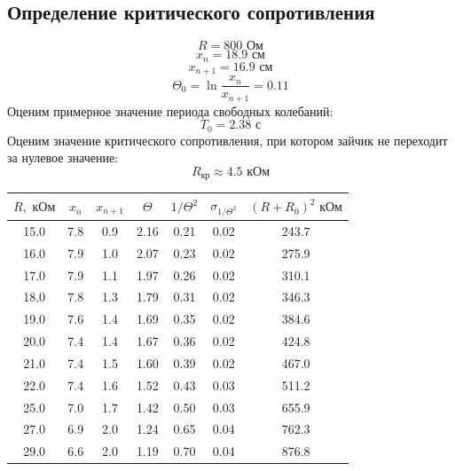 \documentclass[a4paper, 12pt]{article}
\begin{document}
\subsection*{Определение критического сопротивления}
$$R = 800 \text{ Ом}$$
$$x_n = 18.9 \text{ см}$$
$$x_{n+1} = 16.9 \text{ см}$$
$$\Theta_0 = \ln \dfrac{x_n}{x_{n+1}} = 0.11$$	
Оценим примерное значение периода свободных колебаний:
$$T_0 = 2.38 \text{ с}$$
Оценим значение критического сопротивления, при котором зайчик не переходит за нулевое значение:
$$R_{\text{кр}} \approx 4.5 \text{ кОм}$$

\begin{table}[H]
\centering
\begin{tabular}{|c|c|c|c|c|c|c|}
\hline
$R, \text{ кОм}$ & $x_n$ & $x_{n+1}$ & $\Theta$ & $1/\Theta^2$ & $\sigma_{1/\Theta^2}$ & $(R+R_0)^2 \text{ кОм}$ \\ \hline
15.0             & 7.8   & 0.9       & 2.16     & 0.21         & 0.02                  & 243.7                   \\ \hline
16.0             & 7.9   & 1.0       & 2.07     & 0.23         & 0.02                  & 275.9                   \\ \hline
17.0             & 7.9   & 1.1       & 1.97     & 0.26         & 0.02                  & 310.1                   \\ \hline
18.0             & 7.8   & 1.3       & 1.79     & 0.31         & 0.02                  & 346.3                   \\ \hline
19.0             & 7.6   & 1.4       & 1.69     & 0.35         & 0.02                  & 384.6                   \\ \hline
20.0             & 7.4   & 1.4       & 1.67     & 0.36         & 0.02                  & 424.8                   \\ \hline
21.0             & 7.4   & 1.5       & 1.60     & 0.39         & 0.02                  & 467.0                   \\ \hline
22.0             & 7.4   & 1.6       & 1.52     & 0.43         & 0.03                  & 511.2                   \\ \hline
25.0             & 7.0   & 1.7       & 1.42     & 0.50         & 0.03                  & 655.9                   \\ \hline
27.0             & 6.9   & 2.0       & 1.24     & 0.65         & 0.04                  & 762.3                   \\ \hline
29.0             & 6.6   & 2.0       & 1.19     & 0.70         & 0.04                  & 876.8                   \\ \hline

\end{tabular}
\end{table}
\end{document}
